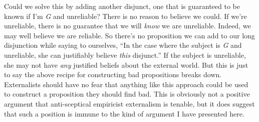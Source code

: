 Could we solve this by adding another disjunct, one that is guaranteed
to be known if I'm \emph{G} and unreliable? There is no reason to
believe we could. If we're unreliable, there is no guarantee that we
will \emph{know} we are unreliable. Indeed, we may well believe we are
reliable. So there's no proposition we can add to our long disjunction
while saying to ourselves, ``In the case where the subject is \emph{G}
and unreliable, she can justifiably believe \emph{this} disjunct.'' If
the subject is unreliable, she may not have \emph{any} justified beliefs
about the external world. But this is just to say the above recipe for
constructing bad propositions breaks down. Externalists should have no
fear that anything like this approach could be used to construct a
proposition they should find bad. This is obviously not a positive
argument that anti-sceptical empiricist externalism is tenable, but it
does suggest that such a position is immune to the kind of argument I
have presented here.
